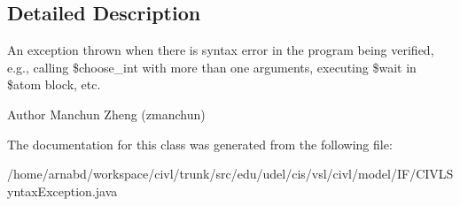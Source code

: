 \subsection{Detailed Description}
An exception thrown when there is syntax error in the program being verified, e.\+g., calling \$choose\+\_\+int with more than one arguments, executing \$wait in \$atom block, etc. 

\begin{DoxyAuthor}{Author}
Manchun Zheng (zmanchun) 
\end{DoxyAuthor}


The documentation for this class was generated from the following file\+:\begin{DoxyCompactItemize}
\item 
/home/arnabd/workspace/civl/trunk/src/edu/udel/cis/vsl/civl/model/\+I\+F/C\+I\+V\+L\+Syntax\+Exception.\+java\end{DoxyCompactItemize}
